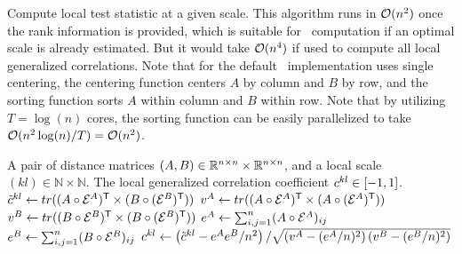 \documentclass[11pt]{article}
\begin{document}
\clearpage

\begin{algorithm}
\caption{Compute local test statistic at a given scale. This algorithm runs in $\mathcal{O}(n^2)$ once the rank information is provided, which is suitable for \Mgc~computation if an optimal scale is already estimated. But it would take $\mathcal{O}(n^4)$ if used to compute all local generalized correlations. Note that for the default \Mgc~implementation uses single centering, the centering function centers $A$ by column and $B$ by row, and the sorting function sorts $A$ within column and $B$ within row. Note that by utilizing $T=\log(n)$ cores, the sorting function can be easily parallelized to take $\mathcal{O}(n^2 \log(n)/T)=\mathcal{O}(n^2)$.}
\label{alg:1scale}
\begin{algorithmic}[1]
\Require A pair of distance matrices $(A, B) \in \mathbb{R}^{n \times n} \times \mathbb{R}^{n \times n}$, and a  local scale $(kl) \in \mathbb{N} \times \mathbb{N}$.
\Ensure The local generalized correlation coefficient $c^{kl} \in [-1,1]$.
  
  
\State $\tilde{c}^{kl} \leftarrow tr((A \circ \mathcal{E}^{A})^{\mathsf{T}} \times (B \circ (\mathcal{E}^{B})^{\mathsf{T}}))$ 
\State $v^{A} \leftarrow tr((A \circ \mathcal{E}^{A})^{\mathsf{T}} \times (A \circ (\mathcal{E}^{A})^{\mathsf{T}}))$ 
\State $v^{B} \leftarrow tr((B \circ \mathcal{E}^{B})^{\mathsf{T}} \times (B \circ (\mathcal{E}^{B})^{\mathsf{T}}))$
\State $e^{A} \leftarrow \sum_{i,j=1}^{n}(A \circ \mathcal{E}^{A})_{ij}$ 
\State $e^{B} \leftarrow \sum_{i,j=1}^{n}(B \circ \mathcal{E}^{B})_{ij}$
\State $c^{kl} \leftarrow \left(\tilde{c}^{kl}-e^{A}e^{B}/n^2\right)/\sqrt{\left(v^{A}-(e^{A}/n)^2 \right) \left(v^{B}-(e^{B}/n)^2\right)}$  

\EndFunction
\end{algorithmic}
\end{algorithm} 

\clearpage
\end{document}
